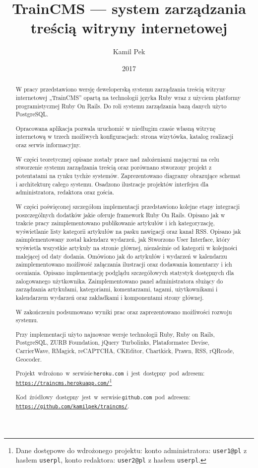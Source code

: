\documentclass[openright]{xmgr}
\author   {Kamil Pek}
\title    {TrainCMS --- system zarządzania treścią witryny internetowej}
\date     {2017}
\begin{document}
\begin{abstract}
W pracy przedstawiono wersję deweloperską systemu zarządzania treścią witryny internetowej  „TrainCMS” opartą na technologii języka Ruby wraz z użyciem platformy programistycznej Ruby On Rails. Do roli systemu zarządzania bazą danych użyto PostgreSQL.

Opracowana aplikacja pozwala uruchomić w niedługim czasie własną witrynę internetową w trzech możliwych konfiguracjach: strona wizytówka, katalog realizacji oraz serwis informacyjny.

W części teoretycznej opisane zostały prace nad założeniami mającymi na celu stworzenie systemu zarządzania treścią oraz porównano stworzony projekt z potentatami na rynku tychże systemów. Zaprezentowano diagramy obrazujące schemat i architekturę całego systemu. Osadzono ilustracje projektów interfejsu dla administratora, redaktora oraz gościa.

W części poświęconej szczegółom implementacji przedstawiono kolejne etapy integracji poszczególnych dodatków jakie oferuje framework Ruby On Rails. Opisano jak w trakcie pracy zaimplementowano publikowanie artykułów i ich kategoryzację, wyświetlanie listy kategorii artykułów na pasku nawigacji oraz kanał RSS. Opisano jak zaimplementowany został kalendarz wydarzeń, jak Stworzono User Interface, który wyświetla wszystkie artykuły na stronie głównej, niezależnie od kategorii w kolejności malejącej od daty dodania. Omówiono jak do artykułów i wydarzeń w kalendarzu zaimplementowano możliwość załączania ilustracji oraz dodawania komentarzy i ich oceniania. Opisano implementację podglądu szczegółowych statystyk dostępnych dla zalogowanego użytkownika. Zaimplementowano panel administratora służący do zarządzania artykułami, kategoriami, komentarzami, tagami, użytkownikami i kalendarzem wydarzeń oraz zakładkami i komponentami strony głównej.

W zakończeniu podsumowano wyniki prac oraz zaprezentowano możliwości rozwoju systemu.

Przy implementacji użyto najnowsze wersje technologii Ruby, Ruby on Rails, PostgreSQL, ZURB Foundation, jQuery Turbolinks, Plataformatec Devise, CarrierWave, RMagick, reCAPTCHA, CKEditor, Chartkick, Prawn, RSS, rQRcode, Geocoder.

\mbox{Projekt wdrożono w serwisie\, \\\texttt{heroku.com} i jest dostępny pod adresem:} \\\texttt{\url{https://traincms.herokuapp.com/}}\footnote{Dane dostępowe do wdrożonego projektu: konto administratora: \texttt{user1@pl} z hasłem \texttt{userpl}, konto redaktora: \texttt{user2@pl} z hasłem \texttt{userpl}.}

\mbox{Kod źródłowy dostępny jest w serwisie\, \\\texttt{github.com} pod adresem:} \\\texttt{\url{https://github.com/kamilpek/traincms/}}.
\end{abstract}
\end{document}
